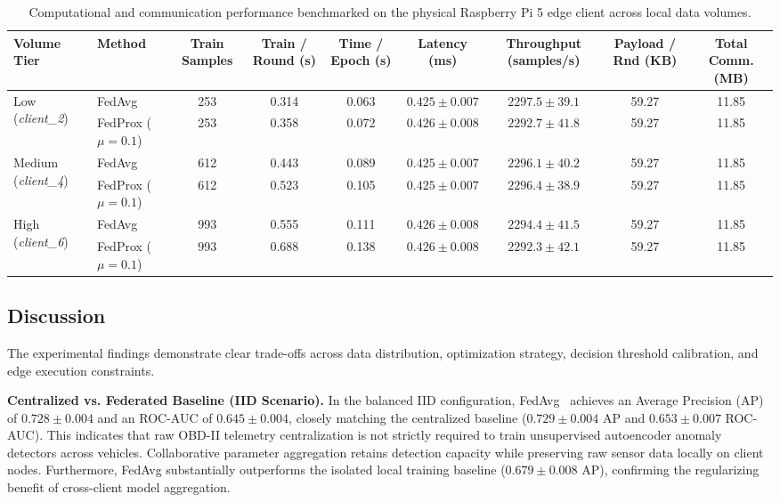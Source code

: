 \documentclass[12pt]{article}
\begin{document}
\begin{table}[t]
	\centering
	\caption{Computational and communication performance benchmarked on the physical Raspberry Pi 5 edge client across local data volumes.}
	\label{tab:raspberry_computational}
	\small
	\begin{tabular}{llccccccc}
		\toprule
		\textbf{Volume Tier} & \textbf{Method} & \textbf{Train Samples} & \textbf{Train / Round (s)} & \textbf{Time / Epoch (s)} & \textbf{Latency (ms)} & \textbf{Throughput (samples/s)} & \textbf{Payload / Rnd (KB)} & \textbf{Total Comm. (MB)} \\
		\midrule
		\multirow{2}{*}{Low (\textit{client\_2})}
		& FedAvg              & 253 & 0.314 & 0.063 & $0.425 \pm 0.007$ & $2297.5 \pm 39.1$ & 59.27 & 11.85 \\
		& FedProx ($\mu=0.1$) & 253 & 0.358 & 0.072 & $0.426 \pm 0.008$ & $2292.7 \pm 41.8$ & 59.27 & 11.85 \\
		\midrule
		\multirow{2}{*}{Medium (\textit{client\_4})}
		& FedAvg              & 612 & 0.443 & 0.089 & $0.425 \pm 0.007$ & $2296.1 \pm 40.2$ & 59.27 & 11.85 \\
		& FedProx ($\mu=0.1$) & 612 & 0.523 & 0.105 & $0.425 \pm 0.007$ & $2296.4 \pm 38.9$ & 59.27 & 11.85 \\
		\midrule
		\multirow{2}{*}{High (\textit{client\_6})}
		& FedAvg              & 993 & 0.555 & 0.111 & $0.426 \pm 0.008$ & $2294.4 \pm 41.5$ & 59.27 & 11.85 \\
		& FedProx ($\mu=0.1$) & 993 & 0.688 & 0.138 & $0.426 \pm 0.008$ & $2292.3 \pm 42.1$ & 59.27 & 11.85 \\
		\bottomrule
	\end{tabular}
\end{table}

\subsection{Discussion}

The experimental findings demonstrate clear trade-offs across data distribution, optimization strategy, decision threshold calibration, and edge execution constraints.

\textbf{Centralized vs. Federated Baseline (IID Scenario).} 
In the balanced IID configuration, FedAvg~\cite{mcmahan2017communication} achieves an Average Precision (AP) of $0.728 \pm 0.004$ and an ROC-AUC of $0.645 \pm 0.004$, closely matching the centralized baseline ($0.729 \pm 0.004$ AP and $0.653 \pm 0.007$ ROC-AUC). This indicates that raw OBD-II telemetry centralization is not strictly required to train unsupervised autoencoder anomaly detectors across vehicles. Collaborative parameter aggregation retains detection capacity while preserving raw sensor data locally on client nodes. Furthermore, FedAvg substantially outperforms the isolated local training baseline ($0.679 \pm 0.008$ AP), confirming the regularizing benefit of cross-client model aggregation.
\end{document}
